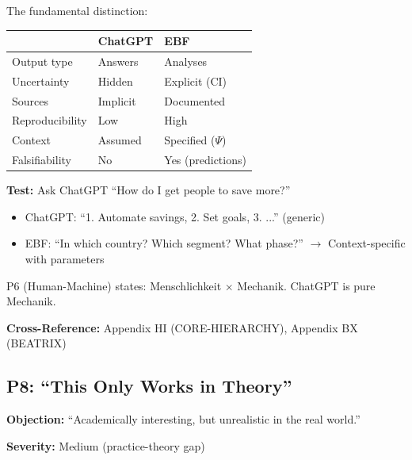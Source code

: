 \begin{axiom}
The fundamental distinction:

\begin{center}
\begin{tabular}{lll}
& \textbf{ChatGPT} & \textbf{EBF} \\
\midrule
Output type & Answers & Analyses \\
Uncertainty & Hidden & Explicit (CI) \\
Sources & Implicit & Documented \\
Reproducibility & Low & High \\
Context & Assumed & Specified ($\Psi$) \\
Falsifiability & No & Yes (predictions) \\
\end{tabular}
\end{center}

\textbf{Test:} Ask ChatGPT ``How do I get people to save more?''
\begin{itemize}[nosep]
    \item ChatGPT: ``1. Automate savings, 2. Set goals, 3. ...'' (generic)
    \item EBF: ``In which country? Which segment? What phase?'' $\rightarrow$ Context-specific with parameters
\end{itemize}

P6 (Human-Machine) states: Menschlichkeit $\times$ Mechanik. ChatGPT is pure Mechanik.
\end{axiom}

\textbf{Cross-Reference:} Appendix HI (CORE-HIERARCHY), Appendix BX (BEATRIX)

\subsection{P8: ``This Only Works in Theory''}
\label{sec:da-p8}

\begin{tcolorbox}[colback=gray!5!white, colframe=gray!75!black]
\textbf{Objection:} ``Academically interesting, but unrealistic in the real world.''

\textbf{Severity:} Medium (practice-theory gap)
\end{tcolorbox}


